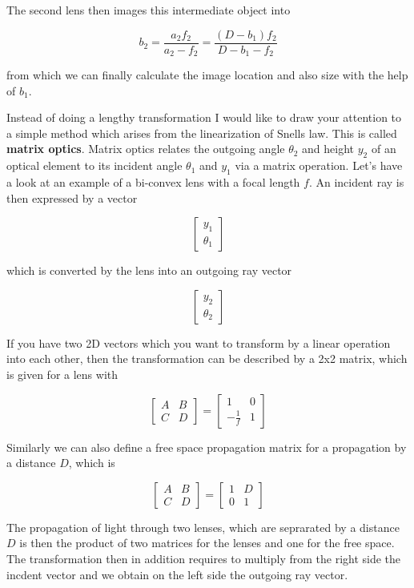 \documentclass[
  a4paper,
]{book}
\begin{document}
The second lens then images this intermediate object into

\[b_2=\frac{a_2 f_2}{a_2-f_2}=\frac{(D-b_1) f_2}{D-b_1-f_2}\]

from which we can finally calculate the image location and also size
with the help of \(b_1\).

Instead of doing a lengthy transformation I would like to draw your
attention to a simple method which arises from the linearization of
Snells law. This is called \textbf{matrix optics}. Matrix optics relates
the outgoing angle \(\theta_2\) and height \(y_2\) of an optical element
to its incident angle \(\theta_1\) and \(y_1\) via a matrix operation.
Let's have a look at an example of a bi-convex lens with a focal length
\(f\). An incident ray is then expressed by a vector

\[\begin{bmatrix}
y_1\\
\theta_1
\end{bmatrix}\]

which is converted by the lens into an outgoing ray vector

\[\begin{bmatrix}
y_2\\
\theta_2
\end{bmatrix}\]

If you have two 2D vectors which you want to transform by a linear
operation into each other, then the transformation can be described by a
2x2 matrix, which is given for a lens with

\[\begin{bmatrix}
A & B\\
C & D
\end{bmatrix}
=
\begin{bmatrix}
1 & 0\\
-\frac{1}{f} & 1
\end{bmatrix}
\]

Similarly we can also define a free space propagation matrix for a
propagation by a distance \(D\), which is

\[\begin{bmatrix}
A & B\\
C & D
\end{bmatrix}
=
\begin{bmatrix}
1 & D\\
0 & 1
\end{bmatrix}
\]

The propagation of light through two lenses, which are seprarated by a
distance \(D\) is then the product of two matrices for the lenses and
one for the free space. The transformation then in addition requires to
multiply from the right side the incdent vector and we obtain on the
left side the outgoing ray vector.
\end{document}
